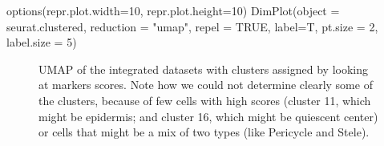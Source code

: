 \documentclass[
  letterpaper,
  DIV=11,
  numbers=noendperiod]{scrartcl}
\newenvironment{Shaded}{\begin{snugshade}}{\end{snugshade}}
\newcommand{\AttributeTok}[1]{\textcolor[rgb]{0.40,0.45,0.13}{#1}}
\newcommand{\ConstantTok}[1]{\textcolor[rgb]{0.56,0.35,0.01}{#1}}
\newcommand{\DecValTok}[1]{\textcolor[rgb]{0.68,0.00,0.00}{#1}}
\newcommand{\FunctionTok}[1]{\textcolor[rgb]{0.28,0.35,0.67}{#1}}
\newcommand{\NormalTok}[1]{\textcolor[rgb]{0.00,0.23,0.31}{#1}}
\newcommand{\StringTok}[1]{\textcolor[rgb]{0.13,0.47,0.30}{#1}}
\begin{document}
\begin{Shaded}
\begin{Highlighting}[]
\FunctionTok{options}\NormalTok{(}\AttributeTok{repr.plot.width=}\DecValTok{10}\NormalTok{, }\AttributeTok{repr.plot.height=}\DecValTok{10}\NormalTok{)}
\FunctionTok{DimPlot}\NormalTok{(}\AttributeTok{object =}\NormalTok{ seurat.clustered, }\AttributeTok{reduction =} \StringTok{"umap"}\NormalTok{, }\AttributeTok{repel =} \ConstantTok{TRUE}\NormalTok{, }\AttributeTok{label=}\NormalTok{T, }\AttributeTok{pt.size =} \DecValTok{2}\NormalTok{, }\AttributeTok{label.size =} \DecValTok{5}\NormalTok{)}
\end{Highlighting}
\end{Shaded}

\begin{figure}[H]


\caption{\label{fig-umapbyeye}UMAP of the integrated datasets with
clusters assigned by looking at markers scores. Note how we could not
determine clearly some of the clusters, because of few cells with high
scores (cluster 11, which might be epidermis; and cluster 16, which
might be quiescent center) or cells that might be a mix of two types
(like Pericycle and Stele).}

\end{figure}%
\end{document}
